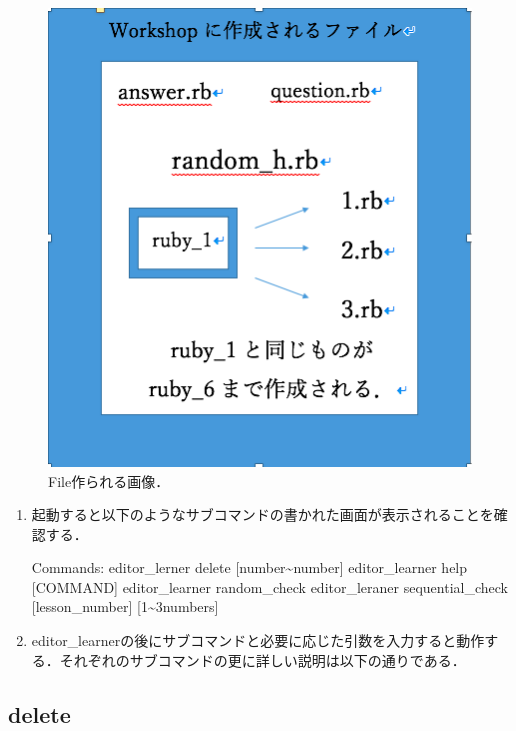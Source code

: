 \documentclass[11pt,dvipdfmx]{jsarticle}
\begin{document}
\begin{figure}[H]
\centering
\begin{center}
\includegraphics[width=150mm]{../../picture/mkdir.png}
\end{center}
\caption{File作られる画像．\label{sample}}

\label{fig:This}
\end{figure}

\begin{enumerate}
\def\labelenumi{\arabic{enumi}.}
\item
  起動すると以下のようなサブコマンドの書かれた画面が表示されることを確認する．

  Commands: editor\_lerner delete {[}number\textasciitilde{}number{]}
  editor\_learner help {[}COMMAND{]} editor\_learner random\_check
  editor\_leraner sequential\_check {[}lesson\_number{]}
  {[}1\textasciitilde{}3numbers{]}
\item
  editor\_learnerの後にサブコマンドと必要に応じた引数を入力すると動作する．それぞれのサブコマンドの更に詳しい説明は以下の通りである．
\end{enumerate}

    \subsection{delete}\label{delete}
\end{document}
